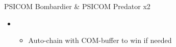 \begin{multicols}{2}
\begin{battle}{PSICOM Bombardier \& PSICOM Predator x2}
\begin{itemize}
    \begin{itemize}
        \item \stagger
        \item Blitz x2
        \item Repeat until Bombardier is dead
    \end{itemize}
    \item \second
    \begin{itemize}
        \item Auto-chain with COM-buffer to win if needed
    \end{itemize}
\end{itemize}
 
\end{battle}

\vfill


\end{multicols}
